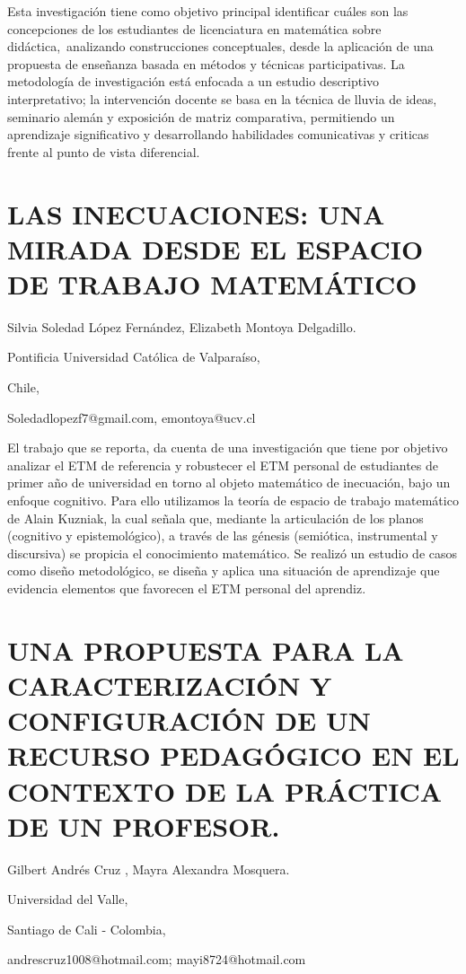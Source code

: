 Esta investigación tiene como objetivo principal identificar cuáles
son las concepciones de los estudiantes de licenciatura en matemática
sobre didáctica, analizando construcciones conceptuales, desde la
aplicación de una propuesta de enseñanza basada en métodos y técnicas
participativas. La metodología de investigación está enfocada a un
estudio descriptivo interpretativo; la intervención docente se basa
en la técnica de lluvia de ideas, seminario alemán y exposición de
matriz comparativa, permitiendo un aprendizaje significativo y desarrollando
habilidades comunicativas y criticas frente al punto de vista diferencial. 


\section{LAS INECUACIONES: UNA MIRADA DESDE EL ESPACIO DE TRABAJO MATEMÁTICO}

\begin{datos}

Silvia Soledad López Fernández, Elizabeth Montoya Delgadillo.

Pontificia Universidad Católica de Valparaíso,

Chile,

Soledadlopezf7@gmail.com, emontoya@ucv.cl\textbf{ }

\end{datos}

El trabajo que se reporta, da cuenta de una investigación que tiene
por objetivo analizar el ETM de referencia y robustecer el ETM personal
de estudiantes de primer año de universidad en torno al objeto matemático
de inecuación, bajo un enfoque cognitivo. Para ello utilizamos la
teoría de espacio de trabajo matemático de Alain Kuzniak, la cual
señala que, mediante la articulación de los planos (cognitivo y epistemológico),
a través de las génesis (semiótica, instrumental y discursiva) se
propicia el conocimiento matemático. Se realizó un estudio de casos
como diseño metodológico, se diseña y aplica una situación de aprendizaje
que evidencia elementos que favorecen el ETM personal del aprendiz. 


\section{\uppercase{ Una propuesta para la caracterización y configuración
de un recurso pedagógico en el contexto de la práctica de un profesor.} }

\begin{datos}

Gilbert Andrés Cruz , Mayra Alexandra Mosquera.

Universidad del Valle,

Santiago de Cali - Colombia,

andrescruz1008@hotmail.com; mayi8724@hotmail.com 

\end{datos}

